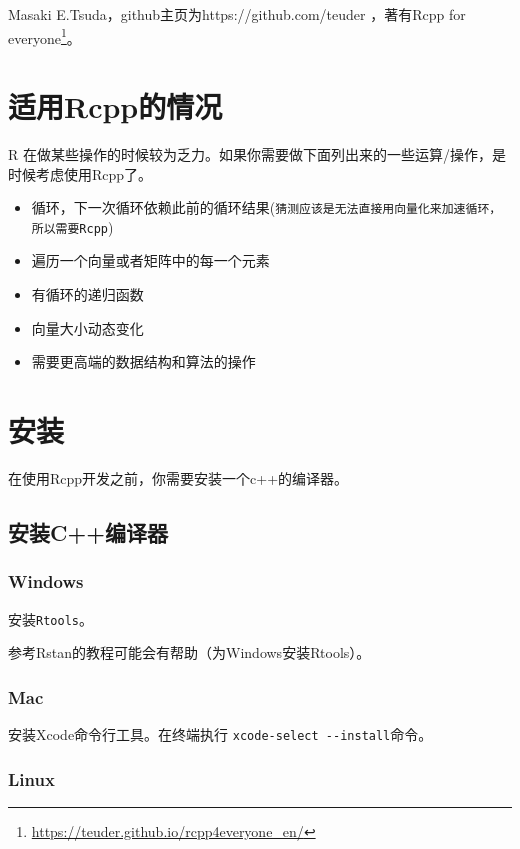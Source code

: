 \documentclass[]{ctexbook}
\providecommand{\tightlist}{%
  \setlength{\itemsep}{0pt}\setlength{\parskip}{0pt}}
\renewcommand{\href}[2]{#2\footnote{\url{#1}}}
\begin{document}
Masaki E.Tsuda，github主页为https://github.com/teuder
，著有\href{https://teuder.github.io/rcpp4everyone_en/}{Rcpp for
everyone}。

\mainmatter

\chapter{适用Rcpp的情况}\label{situations}

R
在做某些操作的时候较为乏力。如果你需要做下面列出来的一些运算/操作，是时候考虑使用Rcpp了。

\begin{itemize}
\tightlist
\item
  循环，下一次循环依赖此前的循环结果(\texttt{猜测应该是无法直接用向量化来加速循环，所以需要Rcpp})
\item
  遍历一个向量或者矩阵中的每一个元素
\item
  有循环的递归函数
\item
  向量大小动态变化
\item
  需要更高端的数据结构和算法的操作
\end{itemize}

\chapter{安装}\label{install}

在使用Rcpp开发之前，你需要安装一个c++的编译器。

\section{安装C++编译器}\label{cppcompiler}

\subsection{Windows}\label{cppcwindows}

安装\texttt{Rtools}。

参考Rstan的教程可能会有帮助（为Windows安装Rtools）。

\subsection{Mac}\label{cppmac}

安装Xcode命令行工具。在终端执行 \texttt{xcode-select\ -\/-install}命令。

\subsection{Linux}\label{cpplinux}
\end{document}
